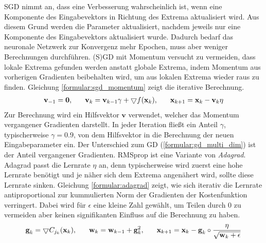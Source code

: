 \newline
SGD nimmt an, dass eine Verbesserung wahrscheinlich ist, wenn eine Komponente des Eingabevektors in Richtung des Extrema aktualisiert wird.
Aus diesem Grund werden die Parameter aktualisiert, nachdem jeweils nur eine Komponente des Eingabevektors aktualisiert wurde.
Dadurch bedarf das neuronale Netzwerk zur Konvergenz mehr Epochen, muss aber weniger Berechnungen durchführen.
\newline
\newline
(S)GD mit Momentum versucht zu vermeiden, dass lokale Extrema gefunden werden anstatt globale Extrema, indem Momentum aus
vorherigen Gradienten beibehalten wird, um aus lokalen Extrema wieder raus zu finden.
Gleichung \ref{formular:sgd_momentum} zeigt die iterative Berechnung.
\begin{align}
    \label{formular:sgd_momentum}
    \textbf{v}_{-1} = \textbf{0}, \hspace{0.6cm} \textbf{v}_k = \textbf{v}_{k-1}\gamma +
    \bigtriangledown f(\textbf{x}_k), \hspace{0.6cm} \textbf{x}_{k+1} = \textbf{x}_k - \textbf{v}_k\eta
\end{align}
Zur Berechnung wird ein Hilfsvektor $\textbf{v}$ verwendet, welcher das Momentum vergangener Gradienten darstellt.
In jeder Iteration fließt ein Anteil $\gamma$, typischerweise $\gamma=0.9$, von dem Hilfsvektor in die Berechnung der neuen Eingabeparameter ein.
Der Unterschied zum GD (\ref{formular:gd_multi_dim}) ist der Anteil vergangener Gradienten.
\newline
\newline
RMSprop ist eine Variante von \textit{Adagrad}.
Adagrad passt die Lernrate $\eta$ an, denn typischerweise wird zuerst eine hohe Lernrate benötigt und je näher sich dem Extrema angenähert wird,
sollte diese Lernrate sinken.
Gleichung \ref{formular:adagrad} zeigt, wie sich iterativ die Lernrate antiproportional
zur kummulierten Norm der Gradienten der Kostenfunktion verringert.
Dabei wird für $\epsilon$ eine kleine Zahl gewählt, um Teilen durch 0 zu vermeiden aber keinen signifikanten Einfluss auf die Berechnung zu haben.
\begin{align}
    \label{formular:adagrad}
    \textbf{g}_k = \bigtriangledown C_{j_k}(\textbf{x}_k), \hspace{0.6cm}
    \textbf{w}_k = \textbf{w}_{k-1} + \textbf{g}_k^2, \hspace{0.6cm}
    \textbf{x}_{k+1} = \textbf{x}_k - \textbf{g}_k \circ \frac{\eta}{\sqrt{\textbf{w}_k + \epsilon}}
\end{align}

